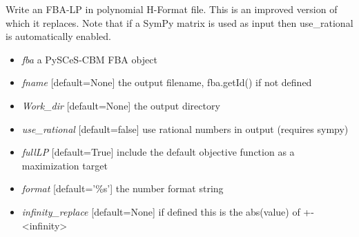 \documentclass[a4paper,11pt,english]{sphinxmanual}
\begin{document}
\begin{fulllineitems}
\label{modules_doc:cbmpy.CBWrite.writeModelHFormatFBA2}
Write an FBA-LP in polynomial H-Format file. This is an improved version of 
which it replaces. Note that if a SymPy matrix is used as input then use\_rational is automatically enabled.
\begin{itemize}
\item {} 
\emph{fba} a PySCeS-CBM FBA object

\item {} 
\emph{fname} {[}default=None{]} the output filename, fba.getId() if not defined

\item {} 
\emph{Work\_dir} {[}default=None{]} the output directory

\item {} 
\emph{use\_rational} {[}default=false{]} use rational numbers in output (requires sympy)

\item {} 
\emph{fullLP} {[}default=True{]} include the default objective function as a maximization target

\item {} 
\emph{format} {[}default='\%s'{]} the number format string

\item {} 
\emph{infinity\_replace} {[}default=None{]} if defined this is the abs(value) of +-\textless{}infinity\textgreater{}

\end{itemize}

\end{fulllineitems}

\end{document}
